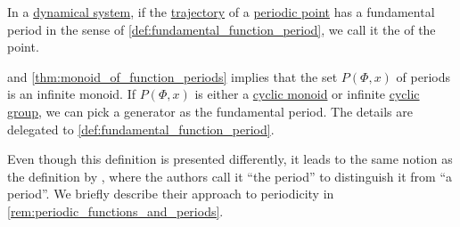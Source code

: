 \begin{definition}\label{def:dynamical_system_fundamental_period}\mimprovised
  In a \hyperref[def:dynamical_system]{dynamical system}, if the \hyperref[def:dynamical_system_trajectory]{trajectory} of a \hyperref[def:dynamical_system_periodicity]{periodic point} has a fundamental period in the sense of \cref{def:fundamental_function_period}, we call it the  of the point.
\end{definition}
\begin{comments}
  \item {} and \cref{thm:monoid_of_function_periods} implies that the set \( P(\Phi, x) \) of periods is an infinite monoid. If \( P(\Phi, x) \) is either a \hyperref[def:cyclic_monoid]{cyclic monoid} or infinite \hyperref[def:cyclic_group]{cyclic group}, we can pick a generator as the fundamental period. The details are delegated to \cref{def:fundamental_function_period}.

  \item Even though this definition is presented differently, it leads to the same notion as the definition by \textcite[def. 11(iv)]{GiuntiMazzola2012DynamicalSystemsOnMonoids}, where the authors call it \enquote{the period} to distinguish it from \enquote{a period}. We briefly describe their approach to periodicity in \cref{rem:periodic_functions_and_periods}.
\end{comments}

